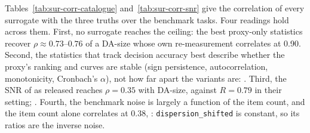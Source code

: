 Tables~\ref{tab:sur-corr-catalogue} and~\ref{tab:sur-corr-snr} give the correlation of every surrogate with the three truths over the benchmark tasks.
Four readings hold across them.
First, no surrogate reaches the ceiling: the best proxy-only statistics recover $\rho \approx 0.73$--$0.76$ of a DA-size whose own re-measurement correlates at 0.90.
Second, the statistics that track decision accuracy best describe whether the proxy's ranking and curves are stable (sign persistence, autocorrelation, monotonicity, Cronbach's $\alpha$), not how far apart the variants are: .
Third, the SNR of \citet{heineman_signal_2025} as released reaches $\rho = 0.35$ with DA-size, against $R = 0.79$ in their setting; .
Fourth, the benchmark noise is largely a function of the item count, and the item count alone correlates at 0.38, : \texttt{dispersion\_shifted} is constant, so its ratios are the inverse noise.

